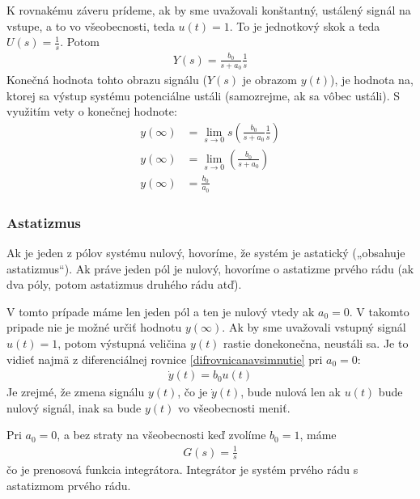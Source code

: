 \documentclass[a4paper, 10pt, ]{article}
\begin{document}
K rovnakému záveru prídeme, ak by sme uvažovali konštantný, ustálený signál na vstupe, a to vo všeobecnosti, teda $u(t) = 1$. To je jednotkový skok a teda $U(s) = \frac{1}{s}$. Potom
\begin{align}
    Y(s) = \frac{b_0}{s + a_0} \frac{1}{s}
\end{align}
Konečná hodnota tohto obrazu signálu ($Y(s)$ je obrazom $y(t)$), je hodnota na, ktorej sa výstup systému potenciálne ustáli (samozrejme, ak sa vôbec ustáli). S využitím vety o konečnej hodnote:
\begin{subequations}
\begin{align}
    y(\infty) &= \lim_{s \to 0} s \left( \frac{b_0}{s + a_0} \frac{1}{s} \right) \\
    y(\infty) &= \lim_{s \to 0} \left( \frac{b_0}{s + a_0}  \right) \\
    y(\infty) &=  \frac{b_0}{a_0}
\end{align}
\end{subequations}






\subsubsection{Astatizmus}

Ak je jeden z pólov systému nulový, hovoríme, že systém je astatický („obsahuje astatizmus“). Ak práve jeden pól je nulový, hovoríme o astatizme prvého rádu (ak dva póly, potom astatizmus druhého rádu atď).

V tomto prípade máme len jeden pól a ten je nulový vtedy ak $a_0 = 0$. V takomto pripade nie je možné určiť hodnotu $y(\infty)$. Ak by sme uvažovali vstupný signál $u(t) = 1$, potom výstupná veličina $y(t)$ rastie donekonečna, neustáli sa. Je to vidieť najmä z diferenciálnej rovnice \eqref{difrovnicanavsimnutie} pri $a_0 = 0$:
\begin{align}
    \dot y(t) = b_0 u(t)
\end{align}
Je zrejmé, že zmena signálu $y(t)$, čo je $\dot y(t)$, bude nulová len ak $u(t)$ bude nulový signál, inak sa bude $y(t)$ vo všeobecnosti meniť.

Pri $a_0 = 0$, a bez straty na všeobecnosti keď zvolíme $b_0 = 1$, máme
\begin{align}
    G(s) = \frac{1}{s}
\end{align}
čo je prenosová funkcia integrátora. Integrátor je systém prvého rádu s astatizmom prvého rádu.
\end{document}
